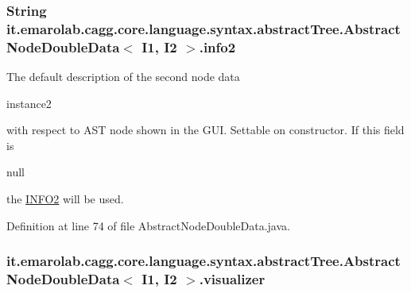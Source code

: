 \hypertarget{classit_1_1emarolab_1_1cagg_1_1core_1_1language_1_1syntax_1_1abstractTree_1_1AbstractNodeDoubleData_3_01I1_00_01I2_01_4_a30a15f6156a57ad8415df26edd3436da}{
\subsubsection[{info2}]{\setlength{\rightskip}{0pt plus 5cm}String it.\-emarolab.\-cagg.\-core.\-language.\-syntax.\-abstract\-Tree.\-Abstract\-Node\-Double\-Data$<$ I1, I2 $>$.info2\hspace{0.3cm}{\ttfamily [protected]}}}\label{classit_1_1emarolab_1_1cagg_1_1core_1_1language_1_1syntax_1_1abstractTree_1_1AbstractNodeDoubleData_3_01I1_00_01I2_01_4_a30a15f6156a57ad8415df26edd3436da}
The default description of the second node data
\begin{DoxyCode}
instance2 
\end{DoxyCode}
 with respect to A\-S\-T node shown in the G\-U\-I. Settable on constructor. If this field is
\begin{DoxyCode}
null 
\end{DoxyCode}
 the \hyperlink{classit_1_1emarolab_1_1cagg_1_1core_1_1language_1_1syntax_1_1abstractTree_1_1AbstractNodeDoubleData_3_01I1_00_01I2_01_4_a32d9370361e05707407e8e10294759c8}{I\-N\-F\-O2} will be used. 

Definition at line 74 of file Abstract\-Node\-Double\-Data.\-java.

\hypertarget{classit_1_1emarolab_1_1cagg_1_1core_1_1language_1_1syntax_1_1abstractTree_1_1AbstractNodeDoubleData_3_01I1_00_01I2_01_4_a7f90846ee58c1fc6dc186c75d02e5c8c}{
\subsubsection[{visualizer}]{ it.\-emarolab.\-cagg.\-core.\-language.\-syntax.\-abstract\-Tree.\-Abstract\-Node\-Double\-Data$<$ I1, I2 $>$.visualizer\hspace{0.3cm}{\ttfamily [private]}}}\label{classit_1_1emarolab_1_1cagg_1_1core_1_1language_1_1syntax_1_1abstractTree_1_1AbstractNodeDoubleData_3_01I1_00_01I2_01_4_a7f90846ee58c1fc6dc186c75d02e5c8c}


